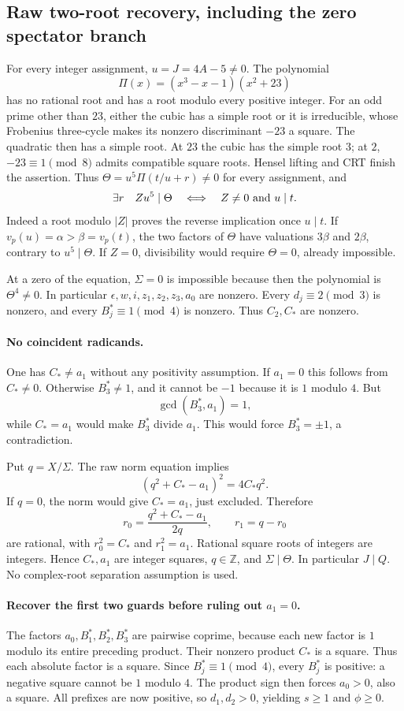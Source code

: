 \subsection{Raw two-root recovery, including the zero spectator branch}
For every integer assignment, $u=J=4A-5\ne0$. The polynomial
\[
 \Pi(x)=(x^3-x-1)(x^2+23)
\]
has no rational root and has a root modulo every positive integer.
For an odd prime other than $23$, either the cubic has a simple root or it
is irreducible, whose Frobenius three-cycle makes its nonzero discriminant
$-23$ a square. The quadratic then has a simple root. At $23$ the cubic has
the simple root $3$; at $2$, $-23\equiv1\pmod8$ admits compatible square
roots. Hensel lifting and CRT finish the assertion. Thus
$\Theta=u^5\Pi(t/u+r)\ne0$ for every assignment, and
\[
 \exists r\quad Zu^5\mid\Theta
 \quad\Longleftrightarrow\quad Z\ne0\ \hbox{and}\ u\mid t.
\]
Indeed a root modulo $|Z|$ proves the reverse implication once $u\mid t$.
If $v_p(u)=\alpha>\beta=v_p(t)$, the two factors of $\Theta$ have
valuations $3\beta$ and $2\beta$, contrary to $u^5\mid\Theta$.
If $Z=0$, divisibility would require $\Theta=0$, already impossible.

At a zero of the equation, $\Sigma=0$ is impossible because then the
polynomial is $\Theta^4\ne0$. In particular
$\epsilon,w,i,z_1,z_2,z_3,a_0$ are nonzero. Every $d_j\equiv2\pmod3$
is nonzero, and every $B_j^*\equiv1\pmod4$ is nonzero. Thus $C_2,C_*$
are nonzero.

\paragraph{No coincident radicands.}
One has $C_*\ne a_1$ without any positivity assumption. If $a_1=0$ this
follows from $C_*\ne0$. Otherwise $B_3^*\ne1$, and it cannot be $-1$
because it is $1$ modulo $4$. But
\[
 \gcd(B_3^*,a_1)=1,
\]
while $C_*=a_1$ would make $B_3^*$ divide $a_1$. This would force
$B_3^*=\pm1$, a contradiction.

Put $q=X/\Sigma$. The raw norm equation implies
\[
 (q^2+C_*-a_1)^2=4C_*q^2.
\]
If $q=0$, the norm would give $C_*=a_1$, just excluded. Therefore
\[
 r_0=\frac{q^2+C_*-a_1}{2q},\qquad r_1=q-r_0
\]
are rational, with $r_0^2=C_*$ and $r_1^2=a_1$. Rational square roots of
integers are integers. Hence $C_*,a_1$ are integer squares,
$q\in\mathbb Z$, and $\Sigma\mid\Theta$. In particular $J\mid Q$.
No complex-root separation assumption is used.

\paragraph{Recover the first two guards before ruling out $a_1=0$.}
The factors $a_0,B_1^*,B_2^*,B_3^*$ are pairwise coprime, because each
new factor is $1$ modulo its entire preceding product. Their nonzero product
$C_*$ is a square. Thus each absolute factor is a square. Since
$B_j^*\equiv1\pmod4$, every $B_j^*$ is positive: a negative square cannot
be $1$ modulo $4$. The product sign then forces $a_0>0$, also a square.
All prefixes are now positive, so $d_1,d_2>0$, yielding $s\ge1$ and
$\phi\ge0$.

